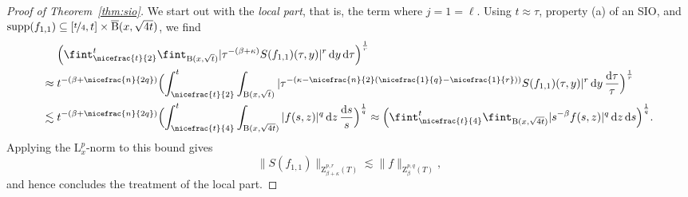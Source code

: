 \documentclass[11pt, leqno]{amsart}
\theoremstyle{definition}
\renewcommand{\L}{\mathrm{L}}
\newcommand{\Z}{\mathrm{Z}}
\renewcommand{\d}{\,\mathrm{d}}
\newcommand{\ddtau}{\,\frac{\mathrm{d}\tau}{\tau}}
\newcommand{\dds}{\,\frac{\mathrm{d}s}{s}}
\newcommand{\B}{\mathrm{B}}
\DeclareMathOperator{\supp}{supp}
\begin{document}
\begin{proof}[Proof of Theorem~\ref{thm:sio}]
		We start out with the \emph{local part}, that is, the term where $j = 1 = \ell$. Using $t \approx \tau$, property (a) of an SIO, and $\supp(f_{1,1}) \subseteq [\nicefrac{t}{4}, t] \times \overline{\B}(x,\sqrt{4t})$, we find
		\begin{align}
			&\Bigl( \fint_{\nicefrac{t}{2}}^t \fint_{\B(x,\sqrt{t})} |\tau^{-(\beta + \kappa)} S(f_{1,1})(\tau,y)|^r \d y \d \tau \Bigr)^\frac{1}{r} \\
			\approx{} &t^{-(\beta + \nicefrac{n}{2q})} \Bigl( \int_{\nicefrac{t}{2}}^t \int_{\B(x,\sqrt{t})} |\tau^{-(\kappa - \nicefrac{n}{2}(\nicefrac{1}{q} - \nicefrac{1}{r}))} S(f_{1,1})(\tau,y)|^r \d y \ddtau \Bigr)^\frac{1}{r} \\
			\lesssim{} &t^{-(\beta + \nicefrac{n}{2q})} \Bigl( \int_{\nicefrac{t}{4}}^t \int_{\B(x,\sqrt{4t})} |f(s,z)|^q \d z \dds \Bigr)^\frac{1}{q}
			\approx \Bigl( \fint_{\nicefrac{t}{4}}^t \fint_{\B(x,\sqrt{4t})} |s^{-\beta} f(s,z)|^q \d z \d s \Bigr)^\frac{1}{q}.
		\end{align}
		Applying the $\L^p_{x}$-norm to this bound gives
		$$\| S(f_{1,1}) \|_{\Z^{p,r}_{\beta + \kappa}(T)} \lesssim \| f \|_{\Z^{p,q}_\beta(T)},$$
		and hence concludes the treatment of the local part.


\end{proof}
\end{document}
